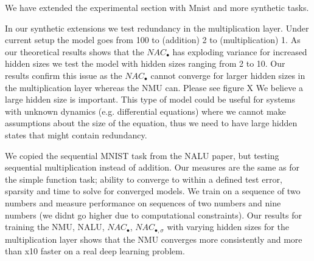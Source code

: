 \documentclass{article}
\begin{document}

We have extended the experimental section with Mnist and more synthetic tasks.

In our synthetic extensions we test redundancy in the multiplication layer. Under current setup the model goes from 100 to (addition) 2 to (multiplication) 1. As our theoretical results shows that the $NAC_{\bullet}$ has exploding variance for increased hidden sizes we test the model with hidden sizes ranging from 2 to 10. Our results confirm this issue as the $NAC_{\bullet}$ cannot converge for larger hidden sizes in the multiplication layer whereas the NMU can. Please see figure X
We believe a large hidden size is important. This type of model could be useful for systems with unknown dynamics (e.g. differential equations) where we cannot make assumptions about the size of the equation, thus we need to have large hidden states that might contain redundancy.

We copied the sequential MNIST task from the NALU paper, but testing sequential multiplication instead of addition.
Our measures are the same as for the simple function task; ability to converge to within a defined test error, sparsity and time to solve for converged models.
We train on a sequence of two numbers and measure performance on sequences of two numbers and nine numbers (we didnt go higher due to computational constraints).
Our results for training the NMU, NALU, $NAC_{\bullet}$, $NAC_{\bullet,\sigma}$ with varying hidden sizes for the multiplication layer shows that the NMU converges more consistently and more than x10 faster on a real deep learning problem.

\end{document}
